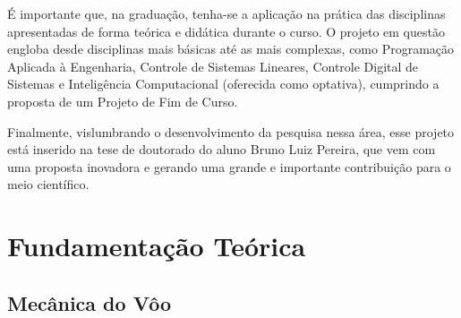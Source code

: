 \documentclass[10pt,a4paper]{article}
\numberwithin{equation}{section}
\begin{document}
\par É importante que, na graduação, tenha-se a aplicação na prática das disciplinas apresentadas de forma teórica e didática durante o curso. O projeto em questão engloba desde disciplinas mais básicas até as mais complexas, como Programação Aplicada à Engenharia, Controle de Sistemas Lineares, Controle Digital de Sistemas e Inteligência Computacional (oferecida como optativa), cumprindo a proposta de um Projeto de Fim de Curso.
\par Finalmente, vislumbrando o desenvolvimento da pesquisa nessa área, esse projeto está inserido na tese de doutorado do aluno Bruno Luiz Pereira, que vem com uma proposta inovadora e gerando uma grande e importante contribuição para o meio científico.


\newpage

\section{Fundamentação Teórica}

\subsection{Mecânica do Vôo}
\end{document}
